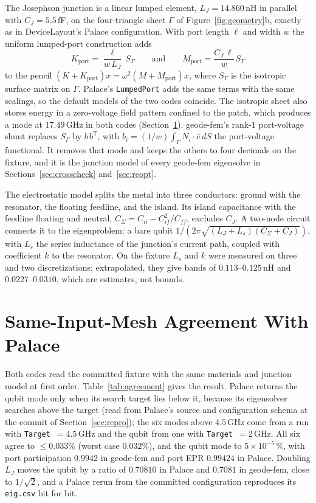 \documentclass{anvil-paper}
\begin{document}
The Josephson junction is a linear lumped element, $L_J = 14.860$\,nH in
parallel with $C_J = 5.5$\,fF, on the four-triangle sheet $\Gamma$ of
Figure~\ref{fig:geometry}b, exactly as in DeviceLayout's Palace
configuration. With port length $\ell$ and width $w$ the uniform
lumped-port construction adds
\begin{equation}
  K_{\mathrm{port}} = \frac{\ell}{w\,L_J}\, S_\Gamma
  \qquad\text{and}\qquad
  M_{\mathrm{port}} = \frac{C_J\,\ell}{w}\, S_\Gamma
  \label{eq:port}
\end{equation}
to the pencil $(K + K_{\mathrm{port}})x = \omega^2(M + M_{\mathrm{port}})x$,
where $S_\Gamma$ is the isotropic surface matrix on $\Gamma$. Palace's
\texttt{LumpedPort} adds the same terms with the same scalings, so the
default models of the two codes coincide. The isotropic sheet also stores
energy in a zero-voltage field pattern confined to the patch, which
produces a mode at $17.49$\,GHz in both codes
(Section~\ref{sec:agreement}). geode-fem's rank-1 port-voltage shunt
replaces $S_\Gamma$ by $b\,b^{\mathsf T}$, with $b_i = (1/w)\int_\Gamma
N_i\cdot\hat e\,dS$ the port-voltage functional. It removes that mode and
keeps the others to four decimals on the fixture, and it is the junction
model of every geode-fem eigensolve in Sections~\ref{sec:crosscheck}
and~\ref{sec:reopt}.

The electrostatic model splits the metal into three conductors: ground
with the resonator, the floating feedline, and the island. Its island
capacitance with the feedline floating and neutral,
$C_\Sigma = C_{ii} - C_{if}^2/C_{ff}$, excludes $C_J$. A two-node circuit
connects it to the eigenproblem: a bare qubit
$1/(2\pi\sqrt{(L_J + L_s)(C_\Sigma + C_J)})$, with $L_s$ the series
inductance of the junction's current path, coupled with coefficient $k$
to the resonator. On the fixture $L_s$ and $k$ were measured on three and
two discretizations; extrapolated, they give bands of
$0.113$--$0.125$\,nH and $0.0227$--$0.0310$, which are estimates, not
bounds.

\section{Same-Input-Mesh Agreement With Palace}
\label{sec:agreement}

Both codes read the committed fixture with the same materials and
junction model at first order. Table~\ref{tab:agreement} gives the
result. Palace returns the qubit mode only when its search target lies
below it, because its eigensolver searches above the target (read from
Palace's source and configuration schema at the commit of
Section~\ref{sec:repro}); the six
modes above $4.5$\,GHz come from a run with \texttt{Target}~$=4.5$\,GHz
and the qubit from one with \texttt{Target}~$=2$\,GHz. All six agree to
$\leq 0.033\%$ (worst case $0.032\%$), and the qubit mode to
$5\times10^{-5}\,\%$, with port participation $0.9942$ in geode-fem and
port EPR $0.99424$ in Palace. Doubling $L_J$ moves the qubit by a ratio of
$0.70810$ in Palace and $0.7081$ in geode-fem, close to $1/\sqrt2$, and a
Palace rerun from the committed configuration reproduces its
\texttt{eig.csv} bit for bit.
\end{document}
